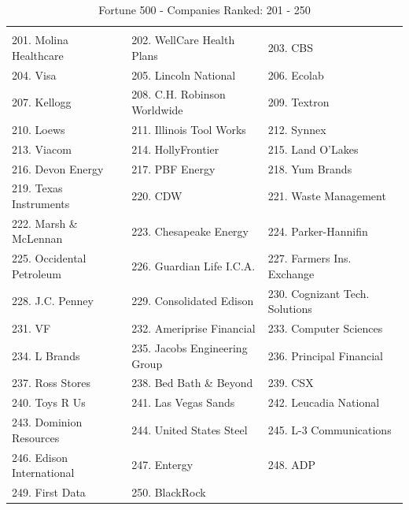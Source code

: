 \documentclass{article}
\begin{document}
\begin{table}[H]
\centering
\caption{Fortune 500 - Companies Ranked: 201 - 250}
\begin{tabular}{lll}
\hline
 \\ 201. Molina Healthcare 
&  202. WellCare Health Plans 
&  203. CBS 
\\ 204. Visa 
&  205. Lincoln National 
&  206. Ecolab 
\\ 207. Kellogg 
&  208. C.H. Robinson Worldwide 
&  209. Textron 
\\ 210. Loews 
&  211. Illinois Tool Works 
&  212. Synnex 
\\ 213. Viacom 
&  214. HollyFrontier 
&  215. Land O'Lakes 
\\ 216. Devon Energy 
&  217. PBF Energy 
&  218. Yum Brands 
\\ 219. Texas Instruments 
&  220. CDW 
&  221. Waste Management 
\\ 222. Marsh \& McLennan 
&  223. Chesapeake Energy 
&  224. Parker-Hannifin 
\\ 225. Occidental Petroleum 
&  226. Guardian Life I.C.A. 
&  227. Farmers Ins. Exchange 
\\ 228. J.C. Penney 
&  229. Consolidated Edison 
&  230. Cognizant Tech. Solutions 
\\ 231. VF 
&  232. Ameriprise Financial 
&  233. Computer Sciences 
\\ 234. L Brands 
&  235. Jacobs Engineering Group 
&  236. Principal Financial 
\\ 237. Ross Stores 
&  238. Bed Bath \& Beyond 
&  239. CSX 
\\ 240. Toys R Us 
&  241. Las Vegas Sands 
&  242. Leucadia National 
\\ 243. Dominion Resources 
&  244. United States Steel 
&  245. L-3 Communications 
\\ 246. Edison International 
&  247. Entergy 
&  248. ADP 
\\ 249. First Data 
&  250. BlackRock 
&   
 \\ \hline

\end{tabular}
\end{table}
\end{document}
